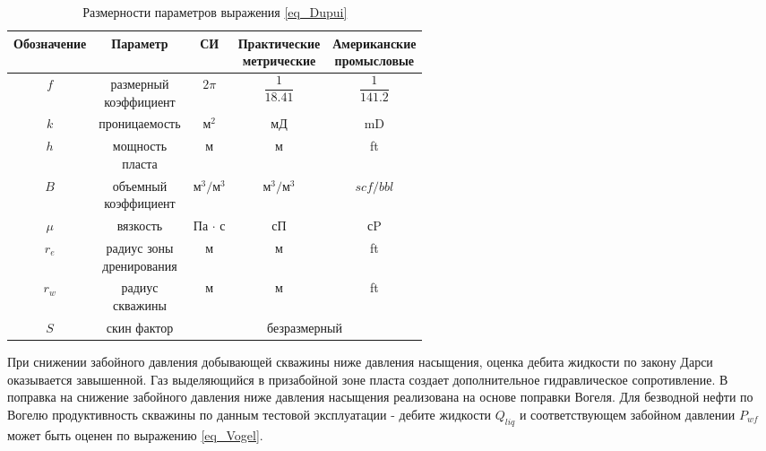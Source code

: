 \begin{table}[]
	\centering
	\caption{Размерности параметров выражения \ref{eq_Dupui}} \label{tab:dim_Dupui}
	\begin{tabular}{|c|c|c|c|c|}
		\hline
		Обозначение & Параметр   			        	& СИ           & \rnttab{Практические \\ метрические}     & \rnttab{Американские\\ промысловые} \\ \hline
		$f$        & \rnttab{размерный \\ коэффициент} & $2\pi$       & $\dfrac{1}{18.41}$     			      & $\dfrac{1}{141.2}$                      \\ \hline
		$k$        & проницаемость           		    & $\text{м}^2$ & мД                    					  & mD   							    \\ \hline
		$h$        & \rnttab{мощность \\ пласта}       & м            & м                      				  & ft   								    \\ \hline		
		$B$        & \rnttab{объемный \\ коэффициент}  & $\text{м}^3/\text{м}^3$    & $\text{м}^3/\text{м}^3$    & $scf/bbl$    						\\ \hline
		$\mu$      & вязкость                           & Па $\cdot$ с & сП                                       & сP                                  \\ \hline
		$r_e$      & \rnttab{радиус зоны \\ дренирования} & м & м                                       & ft                                  \\ \hline
		$r_w$      & \rnttab{радиус  \\ скважины} & м & м                                       & ft                                  \\ \hline
		$S$        & скин фактор 				   & \multicolumn{3}{c|}{безразмерный}                     \\ \hline
	\end{tabular}
\end{table}
 
 При снижении забойного давления добывающей скважины ниже давления насыщения, оценка дебита жидкости по закону Дарси  оказывается завышенной. Газ выделяющийся в призабойной зоне пласта создает дополнительное гидравлическое сопротивление.  В \unf{} поправка на снижение забойного давления ниже давления насыщения реализована на основе поправки Вогеля. Для безводной нефти по Вогелю продуктивность скважины по данным тестовой эксплуатации - дебите жидкости $Q_{liq}$ и соответствующем забойном давлении $P_{wf}$ может быть оценен по выражению \ref{eq_Vogel}.
 
